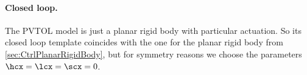 \paragraph{Closed loop.}
The PVTOL model is just a planar rigid body with particular actuation. 
So its  closed loop template coincides with the one for the planar rigid body from \autoref{sec:CtrlPlanarRigidBody}, but for symmetry reasons we choose the parameters $\hcx=\lcx=\scx=0$.

